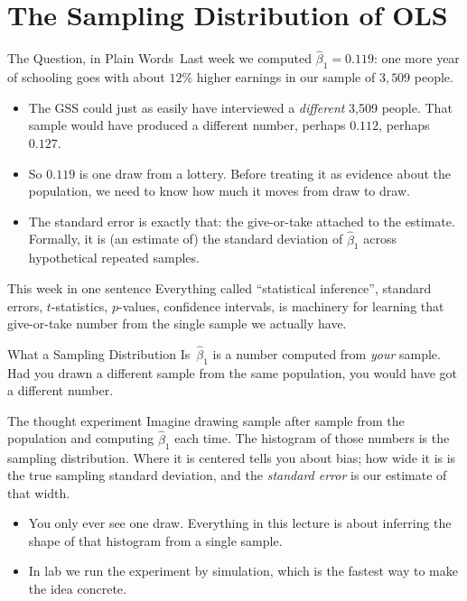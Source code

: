 \documentclass[aspectratio=169,11pt,xcolor=dvipsnames]{beamer}
\newcommand{\core}{\,\raisebox{0.6pt}{\textcolor{corestar}{$\bigstar$}}}
\begin{document}
\section[Sampling Distribution]{The Sampling Distribution of OLS}
\begin{frame}\sectionpage\end{frame}

\begin{frame}{The Question, in Plain Words\core}
Last week we computed $\hat\beta_1 = 0.119$: one more year of schooling goes
with about $12\%$ higher earnings in our sample of $3{,}509$ people.
\vskip3pt
\begin{itemize}\itemsep3pt
  \item The GSS could just as easily have interviewed a \emph{different}
        3{,}509 people. That sample would have produced a different number,
        perhaps $0.112$, perhaps $0.127$.
  \item So $0.119$ is one draw from a lottery. Before treating it as evidence
        about the population, we need to know how much it moves from draw to
        draw.
  \item The \alert{standard error} is exactly that: the give-or-take attached
        to the estimate. Formally, it is (an estimate of) the standard
        deviation of $\hat\beta_1$ across hypothetical repeated samples.
\end{itemize}
\vskip3pt
\begin{block}{This week in one sentence}
Everything called ``statistical inference'', standard errors, $t$-statistics,
$p$-values, confidence intervals, is machinery for learning that give-or-take
number from the single sample we actually have.
\end{block}
\end{frame}

\begin{frame}{What a Sampling Distribution Is\core}
$\hat\beta_1$ is a number computed from \emph{your} sample. Had you drawn a
different sample from the same population, you would have got a different number.
\vskip4pt
\begin{block}{The thought experiment}
Imagine drawing sample after sample from the population and computing
$\hat\beta_1$ each time. The histogram of those numbers is the \alert{sampling
distribution}. Where it is centered tells you about bias; how wide it is is
the true sampling standard deviation, and the \emph{standard error} is our
estimate of that width.
\end{block}
\vskip4pt
\begin{itemize}\itemsep3pt
  \item You only ever see one draw. Everything in this lecture is about inferring
        the shape of that histogram from a single sample.
  \item In lab we run the experiment by simulation, which is the fastest way to
        make the idea concrete.
\end{itemize}
\end{frame}
\end{document}
